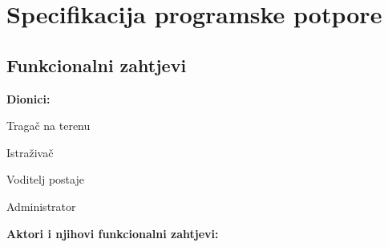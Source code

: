 \chapter{Specifikacija programske potpore}
		
	\section{Funkcionalni zahtjevi}
			
			\noindent \textbf{Dionici:}
			
			\begin{packed_enum}
				\item Tragač na terenu
				\item Istraživač				
				\item Voditelj postaje
				\item Administrator
				
			\end{packed_enum}
			
			\noindent \textbf{Aktori i njihovi funkcionalni zahtjevi:}
			
